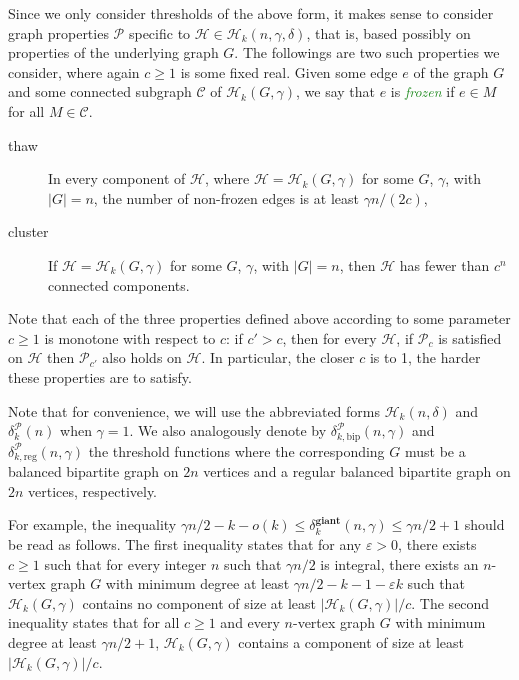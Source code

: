 \documentclass[11pt,a4paper]{article}
\theoremstyle{definition}
\newcommand{\eps}{\varepsilon}
\newcommand{\defin}[1]{\emph{\textcolor{ForestGreen}{#1}}}
\begin{document}
Since we only consider thresholds of the above form, it makes sense to consider graph properties $\mathcal P$ specific to ${\mathcal H}\in {\mathcal H}_k(n,\gamma,\delta)$, that is, based possibly on properties of the underlying graph $G$. The followings are two such properties we consider, where again $c\ge 1$ is some fixed real.
Given some edge $e$ of the graph $G$ and some connected subgraph $\mathcal C$ of ${\mathcal H}_k(G,\gamma)$, we say that $e$ is \defin{frozen} if $e \in M$ for all $M\in {\mathcal C}$.
\begin{description}
\item[thaw] In every component of $\mathcal H$, where ${\mathcal H} = {\mathcal H}_k(G,\gamma)$ for some $G$, $\gamma$, with $|G|=n$, the number of non-frozen edges is at least $\gamma n/(2c)$,
\item[cluster] If ${\mathcal H} = {\mathcal H}_k(G,\gamma)$ for some $G$, $\gamma$, with $|G|=n$, then $\mathcal H$ has fewer than $c^{n}$ connected components.
\end{description}

Note that each of the three properties defined above according to some parameter $c\ge 1$ is monotone with respect to $c$: if $c' > c$, then for every $\mathcal{H}$, if $\mathcal{P}_c$ is satisfied on $\mathcal{H}$ then $\mathcal{P}_{c'}$ also holds on $\mathcal{H}$. In particular, the closer $c$ is to 1, the harder these properties are to satisfy.

Note that for convenience, we will use the abbreviated forms ${\mathcal H}_k(n,\delta)$ and $\delta^{\mathcal P}_k(n)$ when $\gamma=1$. We also analogously denote by
$\delta^{\mathcal P}_{k,\mathrm{bip}}(n,\gamma)$ and $\delta^{\mathcal P}_{k,\mathrm{reg}}(n,\gamma)$
the threshold functions where the corresponding $G$ must be a
balanced bipartite graph on $2n$ vertices and a regular balanced bipartite
graph on $2n$ vertices, respectively.

For example, the inequality
$\gamma n/2- k - o(k) \le \delta^{\mathbf{giant}}_{k} (n,\gamma) \le \gamma n/2+1$ should
be read as follows. The first inequality states that for any $\eps > 0$, there exists $c \ge 1$ such that for every integer $n$ such that $\gamma n/2$ is integral, there exists an $n$-vertex graph $G$ with minimum degree at least $\gamma n/2 - k -1 -\eps k$ such that $\mathcal H_{k}(G,\gamma)$ contains no component of size at least
$|\mathcal H_{k}(G,\gamma)|/c$. The second inequality states that for all $c \ge 1$ and every
$n$-vertex graph $G$ with minimum degree at least $\gamma n/2+1$,
$\mathcal H_{k}(G,\gamma)$ contains a component of size at least
$|\mathcal H_{k}(G,\gamma)|/c$.
\end{document}
